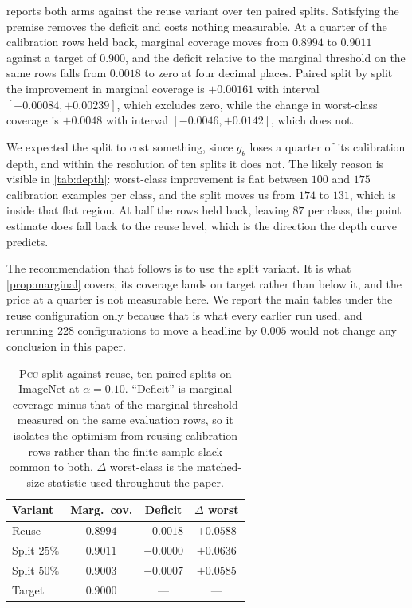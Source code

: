  reports both arms against the reuse variant over ten paired splits.
Satisfying the premise removes the deficit and costs nothing measurable. At a quarter of the
calibration rows held back, marginal coverage moves from $0.8994$ to $0.9011$ against a target
of $0.900$, and the deficit relative to the marginal threshold on the same rows falls from
$0.0018$ to zero at four decimal places. Paired split by split the improvement in marginal
coverage is $+0.00161$ with interval $[+0.00084,+0.00239]$, which excludes zero, while the
change in worst-class coverage is $+0.0048$ with interval $[-0.0046,+0.0142]$, which does not.

We expected the split to cost something, since $g_\theta$ loses a quarter of its calibration
depth, and within the resolution of ten splits it does not. The likely reason is visible in
\cref{tab:depth}: worst-class improvement is flat between $100$ and $175$ calibration examples
per class, and the split moves us from $174$ to $131$, which is inside that flat region. At
half the rows held back, leaving $87$ per class, the point estimate does fall back to the
reuse level, which is the direction the depth curve predicts.

The recommendation that follows is to use the split variant. It is what \cref{prop:marginal}
covers, its coverage lands on target rather than below it, and the price at a quarter is not
measurable here. We report the main tables under the reuse configuration only because that is
what every earlier run used, and rerunning $228$ configurations to move a headline by $0.005$
would not change any conclusion in this paper.

\begin{table}[h]
\centering
\small
\setlength{\tabcolsep}{3pt}
\begin{tabular}{@{}lccc@{}}
\toprule
Variant & Marg.\ cov. & Deficit & $\Delta$ worst \\
\midrule
Reuse         & $0.8994$ & $-0.0018$ & $+0.0588$ \\
Split $25\%$  & $\mathbf{0.9011}$ & $\mathbf{-0.0000}$ & $+0.0636$ \\
Split $50\%$  & $0.9003$ & $-0.0007$ & $+0.0585$ \\
\midrule
Target        & $0.9000$ & ---       & --- \\
\bottomrule
\end{tabular}
\caption{\textsc{Pcc}-split against reuse, ten paired splits on ImageNet at $\alpha=0.10$.
``Deficit'' is marginal coverage minus that of the marginal threshold measured on the same
evaluation rows, so it isolates the optimism from reusing calibration rows rather than the
finite-sample slack common to both. $\Delta$ worst-class is the matched-size statistic used
throughout the paper.}
\label{tab:split}
\end{table}

